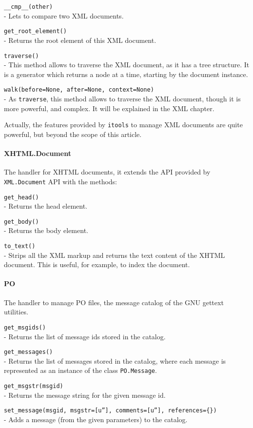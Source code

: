 \begin{api}
  {\tt \_\_cmp\_\_(other)}\\
  - Lets to compare two XML documents.

  {\tt get\_root\_element()}\\
  - Returns the root element of this XML document.

  {\tt traverse()}\\
  - This method allows to traverse the XML document, as it has a tree
    structure. It is a generator which returns a node at a time, starting
    by the document instance.

  {\tt walk(before=None, after=None, context=None)}\\
  - As {\tt traverse}, this method allows to traverse the XML document,
    though it is more powerful, and complex. It will be explained in the
    XML chapter.
\end{api}

Actually, the features provided by {\tt itools} to manage XML documents
are quite powerful, but beyond the scope of this article.

\paragraph{XHTML.Document}

The handler for XHTML documents, it extends the API provided by
{\tt XML.Document} API with the methods:

\begin{api}
  {\tt get\_head()}\\
  - Returns the head element.

  {\tt get\_body()}\\
  - Returns the body element.

  {\tt to\_text()}\\
  - Strips all the XML markup and returns the text content of the XHTML
    document. This is useful, for example, to index the document.
\end{api}

\paragraph{PO}

The handler to manage PO files, the message catalog of the GNU gettext
utilities.

\begin{api}
  {\tt get\_msgids()}\\
  - Returns the list of message ids stored in the catalog.

  {\tt get\_messages()}\\
  - Returns the list of messages stored in the catalog, where each message
    is represented as an instance of the class {\tt PO.Message}.

  {\tt get\_msgstr(msgid)}\\
  - Returns the message string for the given message id.

  {\tt set\_message(msgid, msgstr=[u''], comments=[u''], references=\{\})}\\
  - Adds a message (from the given parameters) to the catalog.
\end{api}

